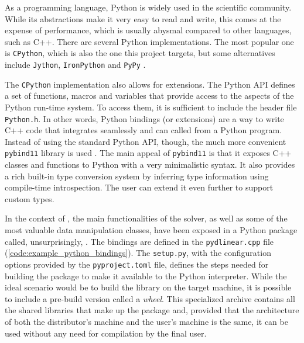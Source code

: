 As a programming language, Python is widely used in the scientific community.
While its abstractions make it very easy to read and write, this comes at the expense of performance, which is usually abysmal compared to other languages, such as C++.
There are several Python implementations.
The most popular one is \texttt{CPython}, which is also the one this project targets, but some alternatives include \texttt{Jython}, \texttt{IronPython} and \texttt{PyPy} \cite{man:python-implementations}.

The \texttt{CPython} implementation also allows for extensions.
The Python API defines a set of functions, macros and variables that provide access to the aspects of the Python run-time system.
To access them, it is sufficient to include the header file \texttt{Python.h}.
In other words, Python bindings (or extensions) are a way to write C++ code that integrates seamlessly and can called from a Python program.
Instead of using the standard Python API, though, the much more convenient \texttt{pybind11} library is used \cite{man:pybind11}.
The main appeal of \texttt{pybind11} is that it exposes C++ classes and functions to Python with a very minimalistic syntax.
It also provides a rich built-in type conversion system by inferring type information using compile-time introspection.
The user can extend it even further to support custom types.

In the context of \dlinear, the main functionalities of the solver, as well as some of the most valuable data manipulation classes, have been exposed in a Python package called, unsurprisingly, \pydlinear.
The bindings are defined in the \texttt{pydlinear.cpp} file (\autoref{code:example_python_bindings}).
The \texttt{setup.py}, with the configuration options provided by the \texttt{pyproject.toml} file, defines the steps needed for building the package to make it available to the Python interpreter.
While the ideal scenario would be to build the \dlinear library on the target machine, it is possible to include a pre-build version called a \textit{wheel}.
This specialized archive contains all the shared libraries that make up the package and, provided that the architecture of both the distributor's machine and the user's machine is the same, it can be used without any need for compilation by the final user.



